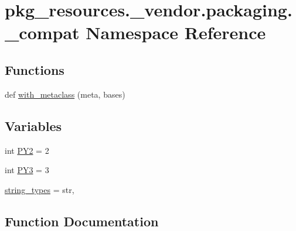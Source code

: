 \hypertarget{namespacepkg__resources_1_1__vendor_1_1packaging_1_1__compat}{}\section{pkg\+\_\+resources.\+\_\+vendor.\+packaging.\+\_\+compat Namespace Reference}
\label{namespacepkg__resources_1_1__vendor_1_1packaging_1_1__compat}
\subsection*{Functions}
\begin{DoxyCompactItemize}
\item 
def \hyperlink{namespacepkg__resources_1_1__vendor_1_1packaging_1_1__compat_abafe60c9896ed27f5eed44e77a4495bf}{with\+\_\+metaclass} (meta, bases)
\end{DoxyCompactItemize}
\subsection*{Variables}
\begin{DoxyCompactItemize}
\item 
int \hyperlink{namespacepkg__resources_1_1__vendor_1_1packaging_1_1__compat_a4f0d729e8aa0a182cf502db984f1bba0}{P\+Y2} = 2
\item 
int \hyperlink{namespacepkg__resources_1_1__vendor_1_1packaging_1_1__compat_a69b47424656e015409ea569f1f8440b5}{P\+Y3} = 3
\item 
\hyperlink{namespacepkg__resources_1_1__vendor_1_1packaging_1_1__compat_af58c8be5dbd0ce510c7b351c3653ec29}{string\+\_\+types} = str,
\end{DoxyCompactItemize}


\subsection{Function Documentation}
\mbox{\label{namespacepkg__resources_1_1__vendor_1_1packaging_1_1__compat_abafe60c9896ed27f5eed44e77a4495bf}} 
